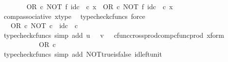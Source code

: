 \begin{isabellebody}
\ \ \ \ \ \ \isamarkupfalse%
\ {\isachardoublequoteopen}{\isacharparenleft}{\kern0pt}OR\ {\isasymcirc}\isactrlsub c\ NOT\ {\isasymtimes}\isactrlsub f\ id\isactrlsub c\ {\isasymOmega}{\isacharparenright}{\kern0pt}\ {\isasymcirc}\isactrlsub c\ x\ {\isacharequal}{\kern0pt}\ OR\ {\isasymcirc}\isactrlsub c\ {\isacharparenleft}{\kern0pt}NOT\ {\isasymtimes}\isactrlsub f\ id\isactrlsub c\ {\isasymOmega}{\isacharparenright}{\kern0pt}\ {\isasymcirc}\isactrlsub c\ x{\isachardoublequoteclose}\isanewline
\ \ \ \ \ \ \ \ \isamarkupfalse%
\ comp{\isacharunderscore}{\kern0pt}associative{}\ x{\isacharunderscore}{\kern0pt}type\ \isamarkupfalse%
\ {\isacharparenleft}{\kern0pt}typecheck{\isacharunderscore}{\kern0pt}cfuncs{\isacharcomma}{\kern0pt}\ force{\isacharparenright}{\kern0pt}\isanewline
\ \ \ \ \ \ \isamarkupfalse%
\ \isamarkupfalse%
\ {\isachardoublequoteopen}{\isachardot}{\kern0pt}{\isachardot}{\kern0pt}{\isachardot}{\kern0pt}\ {\isacharequal}{\kern0pt}\ OR\ {\isasymcirc}\isactrlsub c\ {\isasymlangle}NOT\ {\isasymcirc}\isactrlsub c\ {\isasymt}{\isacharcomma}{\kern0pt}\ id\isactrlsub c\ {\isasymOmega}\ {\isasymcirc}\isactrlsub c\ {\isasymf}{\isasymrangle}{\isachardoublequoteclose}\isanewline
\ \ \ \ \ \ \ \ \isamarkupfalse%
\ {\isacharparenleft}{\kern0pt}typecheck{\isacharunderscore}{\kern0pt}cfuncs{\isacharcomma}{\kern0pt}\ simp\ add{\isacharcolon}{\kern0pt}\ {\isacartoucheopen}u\ {\isacharequal}{\kern0pt}\ {\isasymt}{\isacartoucheclose}\ {\isacartoucheopen}v\ {\isacharequal}{\kern0pt}\ {\isasymf}{\isacartoucheclose}\ cfunc{\isacharunderscore}{\kern0pt}cross{\isacharunderscore}{\kern0pt}prod{\isacharunderscore}{\kern0pt}comp{\isacharunderscore}{\kern0pt}cfunc{\isacharunderscore}{\kern0pt}prod\ x{\isacharunderscore}{\kern0pt}form{\isacharparenright}{\kern0pt}\isanewline
\ \ \ \ \ \ \isamarkupfalse%
\ \isamarkupfalse%
\ {\isachardoublequoteopen}{\isachardot}{\kern0pt}{\isachardot}{\kern0pt}{\isachardot}{\kern0pt}\ {\isacharequal}{\kern0pt}\ OR\ {\isasymcirc}\isactrlsub c\ {\isasymlangle}{\isasymf}{\isacharcomma}{\kern0pt}\ {\isasymf}{\isasymrangle}{\isachardoublequoteclose}\isanewline
\ \ \ \ \ \ \ \ \isamarkupfalse%
\ {\isacharparenleft}{\kern0pt}typecheck{\isacharunderscore}{\kern0pt}cfuncs{\isacharcomma}{\kern0pt}\ simp\ add{\isacharcolon}{\kern0pt}\ NOT{\isacharunderscore}{\kern0pt}true{\isacharunderscore}{\kern0pt}is{\isacharunderscore}{\kern0pt}false\ id{\isacharunderscore}{\kern0pt}left{\isacharunderscore}{\kern0pt}unit{}{\isacharparenright}{\kern0pt}\isanewline

\end{isabellebody}
